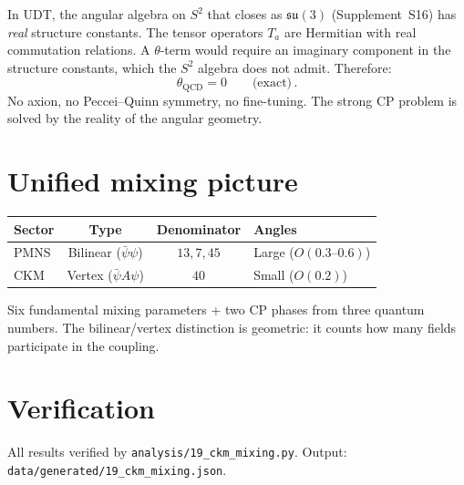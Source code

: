 \documentclass[11pt,letterpaper]{article}
\numberwithin{equation}{section}
\begin{document}
In UDT, the angular algebra on $S^2$ that closes as
$\mathfrak{su}(3)$ (Supplement~S16) has \emph{real} structure
constants.  The tensor operators $T_a$ are Hermitian with real
commutation relations.  A $\theta$-term would require an imaginary
component in the structure constants, which the $S^2$ algebra does
not admit.  Therefore:
\begin{equation}
  \theta_\mathrm{QCD} = 0 \qquad\text{(exact)}\,.
\end{equation}
No axion, no Peccei--Quinn symmetry, no fine-tuning.  The strong CP
problem is solved by the reality of the angular geometry.

\section{Unified mixing picture}
\label{sec:unified}

\begin{center}
\begin{tabular}{lccl}
\toprule
Sector & Type & Denominator & Angles \\
\midrule
PMNS & Bilinear ($\bar\psi\psi$) & $13, 7, 45$
  & Large ($O(0.3\text{--}0.6)$) \\
CKM & Vertex ($\bar\psi A\psi$) & $40$
  & Small ($O(0.2)$) \\
\bottomrule
\end{tabular}
\end{center}

Six fundamental mixing parameters + two CP phases from three quantum
numbers.  The bilinear/vertex distinction is geometric: it counts
how many fields participate in the coupling.

\section{Verification}
\label{sec:verification}

All results verified by \texttt{analysis/19\_ckm\_mixing.py}.
Output: \texttt{data/generated/19\_ckm\_mixing.json}.
\end{document}
